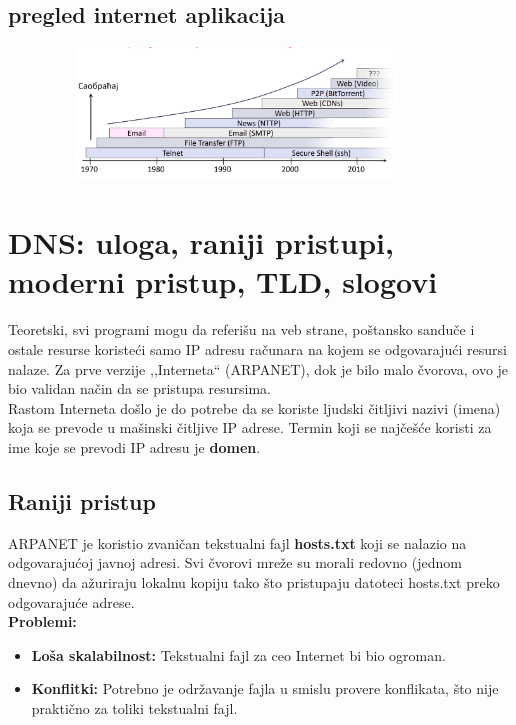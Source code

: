 \documentclass[a4paper]{article}
\begin{document}
    \subsection{pregled internet aplikacija}
        \begin{figure}[H]
            \begin{center}
                \includegraphics[width=100mm,height=35mm]{Slike/aplikativni_sloj3.png}
            \end{center}
        \end{figure}

\section{DNS: uloga, raniji pristupi, moderni pristup, TLD, slogovi}
    Teoretski, svi programi mogu da referišu na veb strane, poštansko sanduče i ostale
    resurse koristeći samo IP adresu računara na kojem se odgovarajući resursi nalaze.
    Za prve verzije ,,Interneta`` (ARPANET), dok je bilo malo čvorova, ovo je bio validan
    način da se pristupa resursima. \\
    \indent Rastom Interneta došlo je do potrebe da se koriste ljudski čitljivi nazivi (imena) 
    koja se prevode u mašinski čitljive IP adrese. Termin koji se najčešće koristi za ime
    koje se prevodi IP adresu je \textbf{domen}.
    
    \subsection{Raniji pristup}
        ARPANET je koristio zvaničan tekstualni fajl \textbf{hosts.txt} koji se nalazio na
        odgovarajućoj javnoj adresi. Svi čvorovi mreže su morali redovno (jednom dnevno) da
        ažuriraju lokalnu kopiju tako što pristupaju datoteci hosts.txt preko odgovarajuće adrese.\\
        \textbf{Problemi:}
        \begin{itemize}
            \item \textbf{Loša skalabilnost:} Tekstualni fajl za ceo Internet bi
                  bio ogroman.
            \item \textbf{Konflitki:} Potrebno je održavanje fajla u smislu provere konflikata,
                  što nije praktično za toliki tekstualni fajl.
        \end{itemize} 
\end{document}

